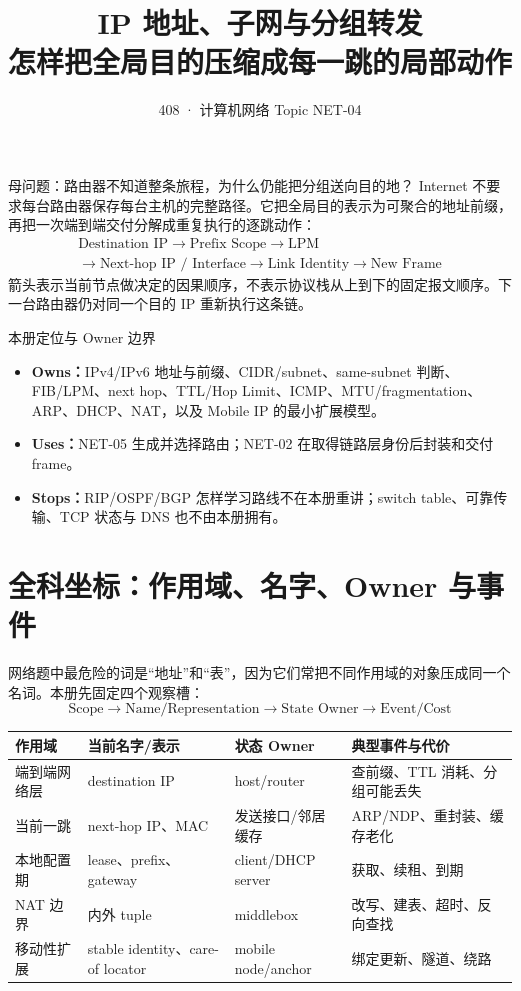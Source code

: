 \documentclass[11pt,a4paper]{ctexart}
\title{\vspace{-1.1cm}\textbf{IP 地址、子网与分组转发}\\[0.4em]\large 怎样把全局目的压缩成每一跳的局部动作}
\author{408 · 计算机网络 Topic NET-04}
\date{}
\newcommand{\kw}[1]{\textbf{\color{deep}#1}}
\begin{document}
\maketitle

\begin{corebox}{母问题：路由器不知道整条旅程，为什么仍能把分组送向目的地？}
Internet 不要求每台路由器保存每台主机的完整路径。它把全局目的表示为可聚合的地址前缀，再把一次端到端交付分解成重复执行的逐跳动作：
\[
\boxed{\begin{gathered}
\text{Destination IP}\to \text{Prefix Scope}\to \text{LPM}\\
\to \text{Next-hop IP / Interface}\to \text{Link Identity}\to \text{New Frame}
\end{gathered}}
\]
箭头表示当前节点做决定的因果顺序，不表示协议栈从上到下的固定报文顺序。下一台路由器仍对同一个目的 IP 重新执行这条链。
\end{corebox}

\begin{methodbox}{本册定位与 Owner 边界}
\begin{itemize}
  \item \kw{Owns：}IPv4/IPv6 地址与前缀、CIDR/subnet、same-subnet 判断、FIB/LPM、next hop、TTL/Hop Limit、ICMP、MTU/fragmentation、ARP、DHCP、NAT，以及 Mobile IP 的最小扩展模型。
  \item \kw{Uses：}NET-05 生成并选择路由；NET-02 在取得链路层身份后封装和交付 frame。
  \item \kw{Stops：}RIP/OSPF/BGP 怎样学习路线不在本册重讲；switch table、可靠传输、TCP 状态与 DNS 也不由本册拥有。
\end{itemize}
\end{methodbox}

\tableofcontents
\newpage

\section{全科坐标：作用域、名字、Owner 与事件}

网络题中最危险的词是“地址”和“表”，因为它们常把不同作用域的对象压成同一个名词。本册先固定四个观察槽：
\[
\boxed{\text{Scope}\to\text{Name/Representation}\to\text{State Owner}\to\text{Event/Cost}}
\]

\begin{center}
\small
\begin{tabularx}{\linewidth}{L{2.2cm}L{3.1cm}L{3.0cm}Y}
\toprule
作用域 & 当前名字/表示 & 状态 Owner & 典型事件与代价\\
\midrule
端到端网络层 & destination IP & host/router & 查前缀、TTL 消耗、分组可能丢失\\
当前一跳 & next-hop IP、MAC & 发送接口/邻居缓存 & ARP/NDP、重封装、缓存老化\\
本地配置期 & lease、prefix、gateway & client/DHCP server & 获取、续租、到期\\
NAT 边界 & 内外 tuple & middlebox & 改写、建表、超时、反向查找\\
移动性扩展 & stable identity、care-of locator & mobile node/anchor & 绑定更新、隧道、绕路\\
\bottomrule
\end{tabularx}
\end{center}
\end{document}
